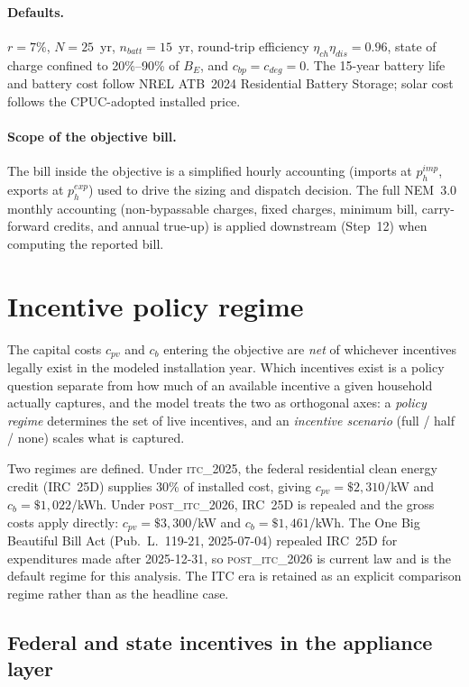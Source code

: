 \documentclass[11pt]{article}
\begin{document}
\paragraph{Defaults.} $r = 7\%$, $N = 25$~yr, $n_{batt} = 15$~yr, round-trip efficiency
$\eta_{ch}\eta_{dis} = 0.96$, state of charge confined to 20\%--90\% of $B_E$, and
$c_{bp} = c_{deg} = 0$. The 15-year battery life and battery cost follow NREL ATB~2024
Residential Battery Storage; solar cost follows the CPUC-adopted installed price.

\paragraph{Scope of the objective bill.} The bill inside the objective is a simplified
hourly accounting (imports at $p_h^{imp}$, exports at $p_h^{exp}$) used to drive the
sizing and dispatch decision. The full NEM~3.0 monthly accounting (non-bypassable
charges, fixed charges, minimum bill, carry-forward credits, and annual true-up) is
applied downstream (Step~12) when computing the reported bill.

\section{Incentive policy regime}
\label{sec:incentives}

The capital costs $c_{pv}$ and $c_{b}$ entering the objective are \emph{net} of whichever
incentives legally exist in the modeled installation year. Which incentives exist is a
policy question separate from how much of an available incentive a given household
actually captures, and the model treats the two as orthogonal axes: a \emph{policy
regime} determines the set of live incentives, and an \emph{incentive scenario}
(full / half / none) scales what is captured.

\sloppypar
Two regimes are defined. Under \textsc{itc\_2025}, the federal residential clean energy
credit (IRC~25D) supplies 30\% of installed cost, giving $c_{pv} = \$2{,}310$/kW and
$c_{b} = \$1{,}022$/kWh. Under \textsc{post\_itc\_2026}, IRC~25D is repealed and the
gross costs apply directly: $c_{pv} = \$3{,}300$/kW and $c_{b} = \$1{,}461$/kWh. The
One Big Beautiful Bill Act (Pub.~L.~119-21, 2025-07-04) repealed IRC~25D for
expenditures made after 2025-12-31, so \textsc{post\_itc\_2026} is current law and is
the default regime for this analysis. The ITC era is retained as an explicit comparison
regime rather than as the headline case.

\subsection*{Federal and state incentives in the appliance layer}
\end{document}
